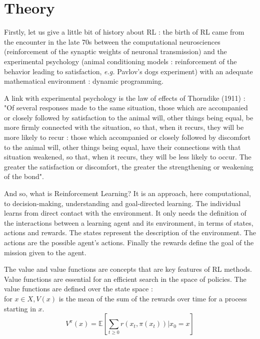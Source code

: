 \documentclass[conference]{IEEEtran}
\newlength\figureheight
\newlength\figurewidth
\begin{document}
%  

\section{Theory}
\label{sec:theory}

Firstly, let us give a little bit of history about RL : the birth of RL came from the encounter in the late 70s between the computational neurosciences (reinforcement of the synaptic weights of neuronal transmission) and the experimental psychology (animal conditioning models : reinforcement of the behavior leading to satisfaction, \textit{e.g.} Pavlov's dogs experiment) 
with an adequate mathematical environment : dynamic programming.

A link with experimental psychology is the law of effects of Thorndike (1911) \cite{MUNOS1}
 : "Of several responses made to the same situation, those which are accompanied or closely followed by satisfaction to the animal will, other things being equal, be more firmly connected with the situation, so that, when it recurs, they will be more likely to recur : those which accompanied or closely followed by discomfort to the animal will, other things being equal, have their connections with that situation weakened, so that, when it recurs, they will be less likely to occur. The greater the satisfaction or discomfort, the greater the strengthening or weakening of the bond".

And so, what is Reinforcement Learning? It is an approach, here computational, to decision-making, understanding and goal-directed learning. 
The individual learns from direct contact with the environment. 
It only needs the definition of the interactions between a learning agent and its environment, in terms of states, actions and rewards.
The states represent the description of the environment.
The actions are the possible agent's actions.
Finally the rewards define the goal of the mission given to the agent.

The value and value functions are concepts that are key features of RL methods. Value functions are essential for an efficient search in the space of policies. 
The value functions are defined over the state space : \\
for $x \in X, V(x)$ is the mean of the sum of the rewards over time for a process starting in $x$.
\[ V^{\pi}(x) = \mathbb{E} [ \sum_{t \geqslant 0} r(x_t,\pi(x_t)) | x_0 = x  ] \]
\end{document}
